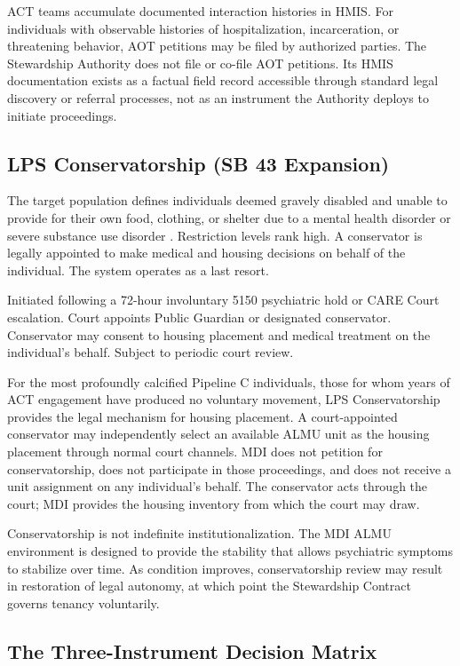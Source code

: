 \documentclass[12pt, letterpaper]{article}
\begin{document}
ACT teams accumulate documented interaction histories in HMIS. For individuals with observable histories of hospitalization, incarceration, or threatening behavior, AOT petitions may be filed by authorized parties. The Stewardship Authority does not file or co-file AOT petitions. Its HMIS documentation exists as a factual field record accessible through standard legal discovery or referral processes, not as an instrument the Authority deploys to initiate proceedings.

\subsection{LPS Conservatorship (SB 43 Expansion)}

The target population defines individuals deemed gravely disabled and unable to provide for their own food, clothing, or shelter due to a mental health disorder or severe substance use disorder \citep{sb_43_2023}. Restriction levels rank high. A conservator is legally appointed to make medical and housing decisions on behalf of the individual. The system operates as a last resort.

Initiated following a 72-hour involuntary 5150 psychiatric hold or CARE Court escalation. Court appoints Public Guardian or designated conservator. Conservator may consent to housing placement and medical treatment on the individual's behalf. Subject to periodic court review.

For the most profoundly calcified Pipeline C individuals, those for whom years of ACT engagement have produced no voluntary movement, LPS Conservatorship provides the legal mechanism for housing placement. A court-appointed conservator may independently select an available ALMU unit as the housing placement through normal court channels. MDI does not petition for conservatorship, does not participate in those proceedings, and does not receive a unit assignment on any individual's behalf. The conservator acts through the court; MDI provides the housing inventory from which the court may draw.

Conservatorship is not indefinite institutionalization. The MDI ALMU environment is designed to provide the stability that allows psychiatric symptoms to stabilize over time. As condition improves, conservatorship review may result in restoration of legal autonomy, at which point the Stewardship Contract governs tenancy voluntarily.

\clearpage

\subsection{The Three-Instrument Decision Matrix}
\end{document}
